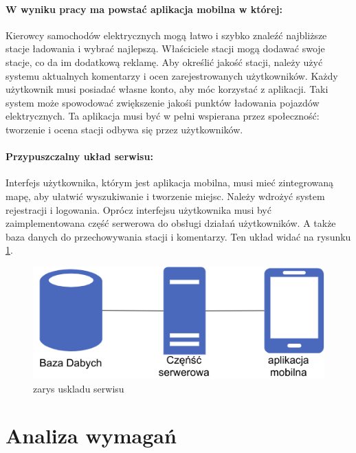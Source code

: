 \paragraph{W wyniku pracy ma powstać aplikacja mobilna w której:}
Kierowcy samochodów elektrycznych mogą łatwo i szybko znaleźć najbliższe stacje ładowania i wybrać najlepszą.
Właściciele stacji mogą dodawać swoje stacje, co da im dodatkową reklamę.
Aby określić jakość stacji, należy użyć systemu aktualnych komentarzy i ocen zarejestrowanych użytkowników.
Każdy użytkownik musi posiadać własne konto, aby móc korzystać z aplikacji.
Taki system może spowodować zwiększenie jakośi punktów ładowania pojazdów elektrycznych.
Ta aplikacja musi być w pełni wspierana przez społeczność: tworzenie i ocena stacji odbywa się przez użytkowników.

\paragraph{Przypuszczalny układ serwisu:}
Interfejs użytkownika, którym jest aplikacja mobilna, musi mieć zintegrowaną mapę, aby ułatwić wyszukiwanie i tworzenie miejsc.
Należy wdrożyć system rejestracji i logowania.
Oprócz interfejsu użytkownika musi być zaimplementowana część serwerowa do obsługi działań użytkowników.
A także baza danych do przechowywania stacji i komentarzy. Ten układ widać na rysunku \ref{fig:zarysuskladuserwisu}.
\begin{figure}[ht]
    \centering
        \includegraphics[width=0.4\linewidth]{rys02/uklad_wstepny.png}
        \caption{zarys uskladu serwisu \cite{diagrams_net}}
    \label{fig:zarysuskladuserwisu}
\end{figure}\newline

\section{Analiza wymagań}
